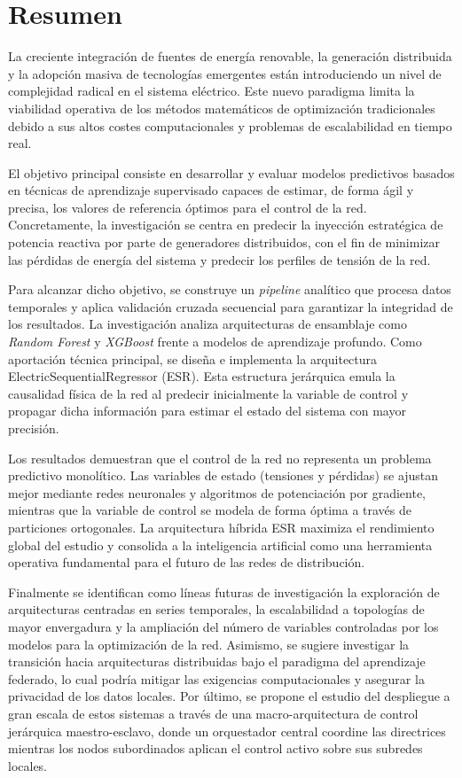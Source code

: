 \chapter*{Resumen}
La creciente integración de fuentes de energía renovable, la generación distribuida y la adopción masiva de tecnologías emergentes están introduciendo un nivel de complejidad radical en el sistema eléctrico. Este nuevo paradigma limita la viabilidad operativa de los métodos matemáticos de optimización tradicionales debido a sus altos costes computacionales y problemas de escalabilidad en tiempo real.

El objetivo principal consiste en desarrollar y evaluar modelos predictivos basados en técnicas de aprendizaje supervisado capaces de estimar, de forma ágil y precisa, los valores de referencia óptimos para el control de la red. Concretamente, la investigación se centra en predecir la inyección estratégica de potencia reactiva por parte de generadores distribuidos, con el fin de minimizar las pérdidas de energía del sistema y predecir los perfiles de tensión de la red.

Para alcanzar dicho objetivo, se construye un \textit{pipeline} analítico que procesa datos temporales y aplica validación cruzada secuencial para garantizar la integridad de los resultados. La investigación analiza arquitecturas de ensamblaje como \textit{Random Forest} y \textit{XGBoost} frente a modelos de aprendizaje profundo. Como aportación técnica principal, se diseña e implementa la arquitectura ElectricSequentialRegressor (ESR). Esta estructura jerárquica emula la causalidad física de la red al predecir inicialmente la variable de control y propagar dicha información para estimar el estado del sistema con mayor precisión.

Los resultados demuestran que el control de la red no representa un problema predictivo monolítico. Las variables de estado (tensiones y pérdidas) se ajustan mejor mediante redes neuronales y algoritmos de potenciación por gradiente, mientras que la variable de control se modela de forma óptima a través de particiones ortogonales. La arquitectura híbrida ESR maximiza el rendimiento global del estudio y consolida a la inteligencia artificial como una herramienta operativa fundamental para el futuro de las redes de distribución.

Finalmente se identifican como líneas futuras de investigación la exploración de arquitecturas centradas en series temporales, la escalabilidad a topologías de mayor envergadura y la ampliación del número de variables controladas por los modelos para la optimización de la red. Asimismo, se sugiere investigar la transición hacia arquitecturas distribuidas bajo el paradigma del aprendizaje federado, lo cual podría mitigar las exigencias computacionales y asegurar la privacidad de los datos locales. Por último, se propone el estudio del despliegue a gran escala de estos sistemas a través de una macro-arquitectura de control jerárquica maestro-esclavo, donde un orquestador central coordine las directrices mientras los nodos subordinados aplican el control activo sobre sus subredes locales.